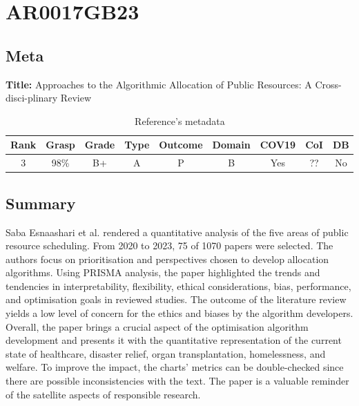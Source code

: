 \section{ AR0017GB23 }


\subsection{Meta}

    \textbf{Title:}
    Approaches to the Algorithmic Allocation of Public Resources: A Cross-disci-plinary Review
    
    \begin{table}[H]
        \centering
        \begin{tabular}{|c|c|c|c|c|c|c|c|c|}
            \hline
                \textbf{Rank} & \textbf{Grasp} & \textbf{Grade} & \textbf{Type} & \textbf{Outcome} & \textbf{Domain} & \textbf{COV19} & \textbf{CoI} & \textbf{DB} \\
            \hline
                3 & 98\% & B+ & A & P & B & Yes & ?? & No \\
            \hline
        \end{tabular}
        \caption{Reference's metadata}
        \label{tab:AR0017GB23}
    \end{table}

\subsection{Summary}
    Saba Esnaashari et al. \cite{x121} rendered a quantitative analysis of the five areas of public resource scheduling. From 2020 to 2023, 75 of 1070 papers were selected. The authors focus on prioritisation and perspectives chosen to develop allocation algorithms. Using PRISMA analysis, the paper highlighted the trends and tendencies in interpretability, flexibility, ethical considerations, bias, performance, and optimisation goals in reviewed studies. The outcome of the literature review yields a low level of concern for the ethics and biases by the algorithm developers. Overall, the paper brings a crucial aspect of the optimisation algorithm development and presents it with the quantitative representation of the current state of healthcare, disaster relief, organ transplantation, homelessness, and welfare. To improve the impact, the charts' metrics can be double-checked since there are possible inconsistencies with the text. The paper is a valuable reminder of the satellite aspects of responsible research.

